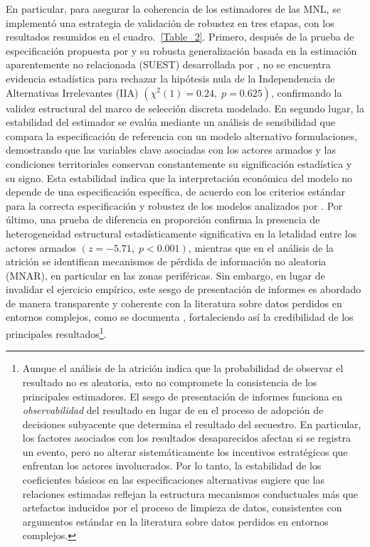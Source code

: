 \documentclass[12pt]{article}
\providecommand{\textcite}{\citet}
\theoremstyle{definition}
\theoremstyle{remark}
\newcommand{\1}{\mathbf{1}}
\begin{document}
En particular, para asegurar la coherencia de los estimadores de las MNL, se implementó una estrategia de validación de robustez en tres etapas, con los resultados resumidos en el cuadro.~\ref{Table_2}. Primero, después de la prueba de especificación propuesta por \textcite{HausmanMcFadden1984} y su robusta generalización basada en la estimación aparentemente no relacionada (SUEST) desarrollada por \textcite{Weesie1999}, no se encuentra evidencia estadística para rechazar la hipótesis nula de la Independencia de Alternativas Irrelevantes (IIA) \((\chi^2(1)=0.24,\; p=0.625)\), confirmando la validez estructural del marco de selección discreta modelado. En segundo lugar, la estabilidad del estimador se evalúa mediante un análisis de sensibilidad que compara la especificación de referencia con un modelo alternativo formulaciones, demostrando que las variables clave asociadas con los actores armados y las condiciones territoriales conservan constantemente su significación estadística y su signo. Esta estabilidad indica que la interpretación económica del modelo no depende de una especificación específica, de acuerdo con los criterios estándar para la correcta especificación y robustez de los modelos analizados por \textcite{Wooldridge2010}. Por último, una prueba de diferencia en proporción confirma la presencia de heterogeneidad estructural estadísticamente significativa en la letalidad entre los actores armados \((z=-5.71,\; p<0.001)\), mientras que en el análisis de la atrición se identifican mecanismos de pérdida de información no aleatoria (MNAR), en particular en las zonas periféricas. Sin embargo, en lugar de invalidar el ejercicio empírico, este sesgo de presentación de informes es abordado de manera transparente y coherente con la literatura sobre datos perdidos en entornos complejos, como se documenta \textcite{LittleRubin2020}, fortaleciendo así la credibilidad de los principales resultados\footnote{Aunque el análisis de la atrición indica que la probabilidad de observar el resultado no es aleatoria, esto no compromete la consistencia de los principales estimadores. El sesgo de presentación de informes funciona en \emph{observabilidad} del resultado en lugar de en el proceso de adopción de decisiones subyacente que determina el resultado del secuestro. En particular, los factores asociados con los resultados desaparecidos afectan si se registra un evento, pero no alterar sistemáticamente los incentivos estratégicos que enfrentan los actores involucrados. Por lo tanto, la estabilidad de los coeficientes básicos en las especificaciones alternativas sugiere que las relaciones estimadas reflejan la estructura mecanismos conductuales más que artefactos inducidos por el proceso de limpieza de datos, consistentes con argumentos estándar en la literatura sobre datos perdidos en entornos complejos.}.
\end{document}
